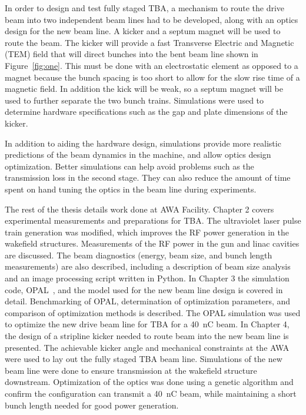  \label{sec:requirements}

In order to design and test fully staged TBA, a mechanism to route the drive beam into two independent beam lines had to be developed, along with an optics design for the new beam line. A kicker and a septum magnet will be used to route the beam. 
The kicker will provide a fast Transverse Electric and Magnetic (TEM) field 
that will direct bunches into the bent beam line shown in Figure~\ref{fig:one}. 
This must be done with an electrostatic element as opposed to a magnet because 
the bunch spacing is too short to allow for the slow rise time of a magnetic field.
In addition the kick will be weak, so a septum magnet will be used to further
separate the two bunch trains. Simulations were used to determine hardware specifications such as the gap and plate dimensions of the kicker.

In addition to aiding the hardware design, simulations provide more realistic predictions of the beam dynamics in the machine, and allow optics design optimization.
Better simulations can help avoid problems such as the transmission loss in the second stage.
They can also reduce the amount of time spent on hand tuning the optics in the 
beam line during experiments.






The rest of the thesis details work done at AWA Facility.
Chapter 2 covers experimental measurements and preparations for TBA.
The ultraviolet laser pulse train generation was modified, 
which improves the RF power generation in the wakefield structures.
Measurements of the RF power in the gun and linac cavities are discussed.  
The beam diagnostics (energy, beam size, and bunch length measurements) are also described, including a description of beam size analysis and an image processing script written in Python. 
In Chapter 3 the simulation code, OPAL~\cite{opal}, and the model used for the new beam line design is covered in detail.
Benchmarking of OPAL, determination of optimization parameters, and comparison of optimization methods is described.  The OPAL simulation was used to optimize the new drive beam line for TBA for a \SI{40}{nC} beam. 
In Chapter 4, the design of a stripline kicker needed to route beam into the new beam line is presented.
The achievable kicker angle and mechanical constraints at the AWA 
were used to lay out the fully staged TBA beam line. 
Simulations of the new beam line were done to ensure transmission at
the wakefield structure downstream. Optimization of the optics was done using 
a genetic algorithm and confirm the configuration can transmit a \SI{40}{nC} beam, while maintaining a short bunch length needed for good power generation.



